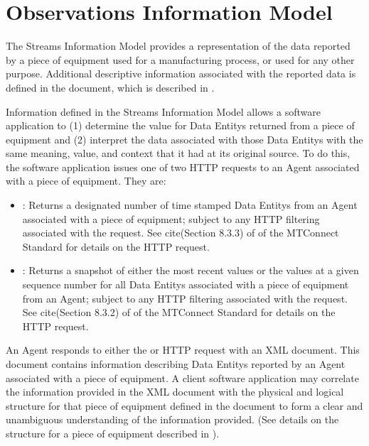 
\section{Observations Information Model}
\label{sec:Observations Information Model}

The \gls{Streams Information Model} provides a representation of the data reported by a piece of equipment used for a manufacturing process, or used for any other purpose.  Additional descriptive information associated with the reported data is defined in the  document, which is described in .

Information defined in the \gls{Streams Information Model} allows a software application to (1) determine the value for \glspl{Data Entity} returned from a piece of equipment and (2) interpret the data associated with those \glspl{Data Entity} with the same meaning, value, and context that it had at its original source.  To do this, the software application issues one of two HTTP requests to an \gls{Agent} associated with a piece of equipment.  They are:


\begin{itemize}
\item {}:  Returns a designated number of time stamped \glspl{Data Entity} from an \gls{Agent} associated with a piece of equipment; subject to any HTTP filtering associated with the request.  See {{cite(Section 8.3.3)}} of  of the MTConnect Standard for details on the  HTTP request.

\item {}:  Returns a snapshot of either the most recent values or the values at a given sequence number for all \glspl{Data Entity} associated with a piece of equipment from an \gls{Agent}; subject to any HTTP filtering associated with the request.  See {{cite(Section 8.3.2)}} of  of the MTConnect Standard for details on the  HTTP request.
\end{itemize}

An \gls{Agent} responds to either the  or  HTTP request with an \linebreak{} \gls{XML} document.  This document contains information describing \glspl{Data Entity} reported by an \gls{Agent} associated with a piece of equipment.   A client software application may correlate the information provided in the  \gls{XML} document with the physical and logical structure for that piece of equipment defined in the  document to form a clear and unambiguous understanding of the information provided.  (See details on the structure for a piece of equipment described in ).

